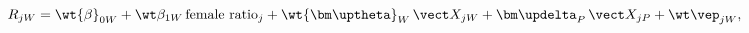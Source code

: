 \begin{equation}\label{equation6}
	R_{jW}=\wt{\beta}_{0W}+\wt\beta_{1W}\,\text{female ratio}_j+\wt{\bm\uptheta}_W\,\vect X_{jW}+\bm\updelta_P\,\vect X_{jP}+\wt\vep_{jW},
\end{equation}
